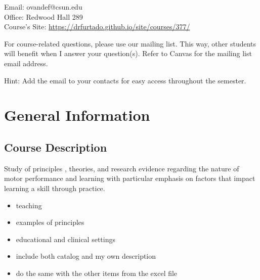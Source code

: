 \documentclass[
  letterpaper,
  DIV=11,
  numbers=noendperiod]{scrartcl}
\providecommand{\tightlist}{%
  \setlength{\itemsep}{0pt}\setlength{\parskip}{0pt}}\usepackage{longtable,booktabs,array}
\begin{document}
Email: ovandef@csun.edu\\
Office: Redwood Hall 289\\
Course's Site: \url{https://drfurtado.github.io/site/courses/377/}

\begin{tcolorbox}[enhanced jigsaw, colbacktitle=quarto-callout-note-color!10!white, rightrule=.15mm, opacityback=0, colframe=quarto-callout-note-color-frame, leftrule=.75mm, breakable, bottomrule=.15mm, arc=.35mm, opacitybacktitle=0.6, title=\textcolor{quarto-callout-note-color}{\faInfo}\hspace{0.5em}{Note}, titlerule=0mm, toptitle=1mm, bottomtitle=1mm, left=2mm, toprule=.15mm, colback=white, coltitle=black]

For course-related questions, please use our mailing list. This way,
other students will benefit when I answer your question(s). Refer to
Canvas for the mailing list email address.

Hint: Add the email to your contacts for easy access throughout the
semester.

\end{tcolorbox}

\hypertarget{general-information}{%
\section{General Information}\label{general-information}}

\hypertarget{course-description}{%
\subsection{Course Description}\label{course-description}}

Study of principles , theories, and research evidence regarding the
nature of motor performance and learning with particular emphasis on
factors that impact learning a skill through practice.

\begin{itemize}
\tightlist
\item
  teaching
\item
  examples of principles
\item
  educational and clinical settings
\item
  include both catalog and my own description
\item
  do the same with the other items from the excel file
\end{itemize}
\end{document}
